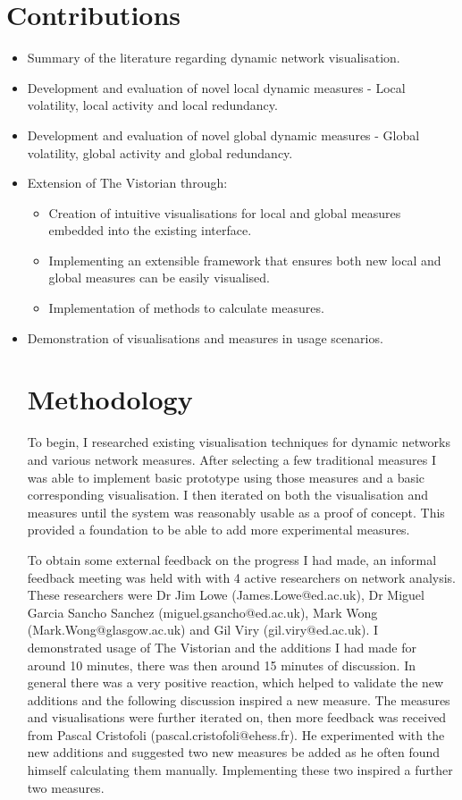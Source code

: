 \section{Contributions}
\label{objectives}
\begin{itemize}
    \item Summary of the literature regarding dynamic network visualisation.
    \item Development and evaluation of novel local dynamic measures - Local volatility, local activity and local redundancy.
    \item Development and evaluation of novel global dynamic measures - Global volatility, global activity and global redundancy.
    \item Extension of The Vistorian through:
    \begin{itemize}
        \item Creation of intuitive visualisations for local and global measures embedded into the existing interface.
        \item Implementing an extensible framework that ensures both new local and global measures can be easily visualised.
        \item Implementation of methods to calculate measures.
    \end{itemize}
    \item Demonstration of visualisations and measures in usage scenarios.

\section{Methodology}

To begin, I researched existing visualisation techniques for dynamic networks and various network measures. After selecting a few traditional measures I was able to implement basic prototype using those measures and a basic corresponding visualisation. I then iterated on both the visualisation and measures until the system was reasonably usable as a proof of concept. This provided a foundation to be able to add more experimental measures.

To obtain some external feedback on the progress I had made, an informal feedback meeting was held with with 4 active researchers on network analysis. These researchers were Dr Jim Lowe (James.Lowe@ed.ac.uk), Dr Miguel Garcia Sancho Sanchez (miguel.gsancho@ed.ac.uk), Mark Wong (Mark.Wong@glasgow.ac.uk) and Gil Viry (gil.viry@ed.ac.uk). I demonstrated usage of The Vistorian and the additions I had made for around 10 minutes, there was then around 15 minutes of discussion. In general there was a very positive reaction, which helped to validate the new additions and the following discussion inspired a new measure. The measures and visualisations were further iterated on, then more feedback was received from Pascal Cristofoli (pascal.cristofoli@ehess.fr). He experimented with the new additions and suggested two new measures be added as he often found himself calculating them manually. Implementing these two inspired a further two measures.  
\end{itemize}





